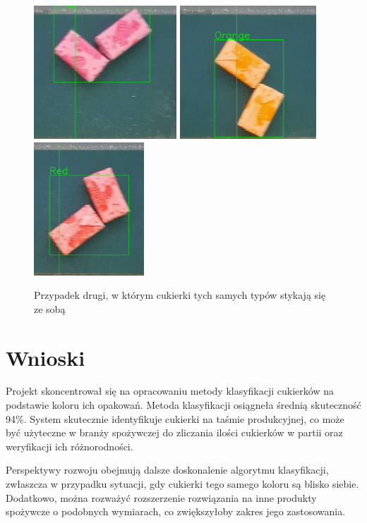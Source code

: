 \documentclass{article}
\begin{document}
\begin{center}
\begin{figure}[H]
\includegraphics[height=5cm]{pink.png}
\includegraphics[height=5cm]{orange.png}
\includegraphics[height=5cm]{red.png}
\caption{Przypadek drugi, w którym cukierki tych samych typów stykają się ze sobą}
\end{figure}
\end{center}

\section{Wnioski}
\label{Wnioski}

Projekt skoncentrował się na opracowaniu metody klasyfikacji cukierków na podstawie koloru ich opakowań. Metoda klasyfikacji osiągneła średnią skuteczność 94\%. System skutecznie identyfikuje cukierki na taśmie produkcyjnej, co może być użyteczne w branży spożywczej do zliczania ilości cukierków w partii oraz weryfikacji ich różnorodności.

Perspektywy rozwoju obejmują dalsze doskonalenie algorytmu klasyfikacji, zwłaszcza w przypadku sytuacji, gdy cukierki tego samego koloru są blisko siebie. Dodatkowo, można rozważyć rozszerzenie rozwiązania na inne produkty spożywcze o podobnych wymiarach, co zwiększyłoby zakres jego zastosowania.
\end{document}
